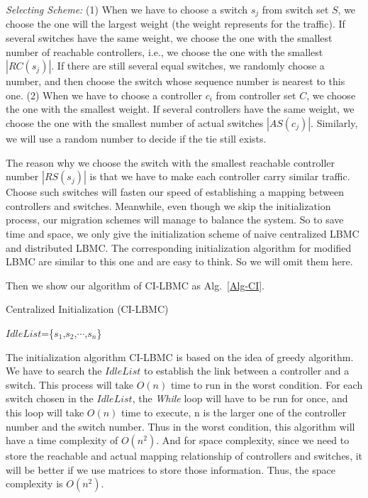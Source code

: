 \emph{Selecting Scheme:} (1) When we have to choose a switch $s_j$ from switch set $S$, we choose the one will the largest weight (the weight represents for the traffic). If several switches have the same weight, we choose the one with the smallest number of reachable controllers, i.e., we choose the one with the smallest $|RC(s_j)|$. If there are still several equal switches, we randomly choose a number, and then choose the switch whose sequence number is nearest to this one. (2) When we have to choose a controller $c_i$ from controller set $C$, we choose the one with the smallest weight. If several controllers have the same weight, we choose the one with the smallest number of actual switches $|AS(c_j)|$. Similarly, we will use a random number to decide if the tie still exists.

The reason why we choose the switch with the smallest reachable controller number $|RS(s_j)|$ is that we have to make each controller carry similar traffic. Choose such switches will fasten our speed of establishing a mapping between controllers and switches. Meanwhile, even though we skip the initialization process, our migration schemes will manage to balance the system. So to save time and space, we only give the initialization scheme of naive centralized LBMC and distributed LBMC. The corresponding initialization algorithm for modified LBMC are similar to this one and are easy to think. So we will omit them here. 

Then we show our algorithm of CI-LBMC as Alg.~\ref{Alg-CI}.
\vspace{-4mm}
\begin{algorithm}
\caption{Centralized Initialization (CI-LBMC)} \label{Alg-CI}
\BlankLine 
$IdleList$=\{$s_1$,$s_2$,$\cdots$,$s_n$\}\;
\end{algorithm}
\vspace{-4mm}

The initialization algorithm CI-LBMC is based on the idea of greedy algorithm. We have to search the $IdleList$ to establish the link between a controller and a switch. This process will take $O(n)$ time to run in the worst condition. For each switch chosen in the $IdleList$, the \emph{While} loop will have to be run for once, and this loop will take $O(n)$ time to execute, n is the larger one of the controller number and the switch number. Thus in the worst condition, this algorithm will have a time complexity of $O(n^2)$. And for space complexity, since we need to store the reachable and actual mapping relationship of controllers and switches, it will be better if we use matrices to store those information. Thus, the space complexity is $O(n^2)$.

